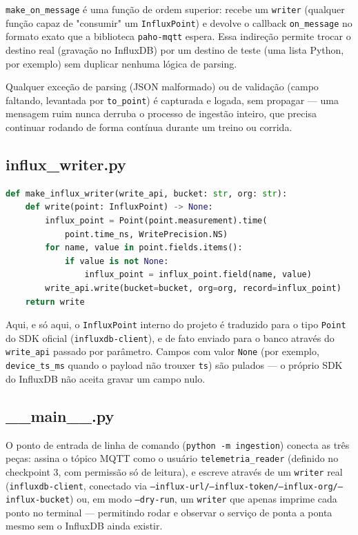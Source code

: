 \documentclass[11pt,a4paper]{article}
\begin{document}
\texttt{make\_on\_message} é uma função de ordem superior: recebe um \texttt{writer} (qualquer função capaz de "consumir" um \texttt{InfluxPoint}) e devolve o callback \texttt{on\_message} no formato exato que a biblioteca \texttt{paho-mqtt} espera. Essa indireção permite trocar o destino real (gravação no InfluxDB) por um destino de teste (uma lista Python, por exemplo) sem duplicar nenhuma lógica de parsing.

Qualquer exceção de parsing (JSON malformado) ou de validação (campo faltando, levantada por \texttt{to\_point}) é capturada e logada, sem propagar --- uma mensagem ruim nunca derruba o processo de ingestão inteiro, que precisa continuar rodando de forma contínua durante um treino ou corrida.

\subsection{influx\_writer.py}

\begin{lstlisting}[language=Python,caption={ingestion/influx\_writer.py}]
def make_influx_writer(write_api, bucket: str, org: str):
    def write(point: InfluxPoint) -> None:
        influx_point = Point(point.measurement).time(
            point.time_ns, WritePrecision.NS)
        for name, value in point.fields.items():
            if value is not None:
                influx_point = influx_point.field(name, value)
        write_api.write(bucket=bucket, org=org, record=influx_point)
    return write
\end{lstlisting}

Aqui, e só aqui, o \texttt{InfluxPoint} interno do projeto é traduzido para o tipo \texttt{Point} do SDK oficial (\texttt{influxdb-client}), e de fato enviado para o banco através do \texttt{write\_api} passado por parâmetro. Campos com valor \texttt{None} (por exemplo, \texttt{device\_ts\_ms} quando o payload não trouxer \texttt{ts}) são pulados --- o próprio SDK do InfluxDB não aceita gravar um campo nulo.

\subsection{\_\_main\_\_.py}

O ponto de entrada de linha de comando (\texttt{python -m ingestion}) conecta as três peças: assina o tópico MQTT como o usuário \texttt{telemetria\_reader} (definido no checkpoint 3, com permissão só de leitura), e escreve através de um \texttt{writer} real (\texttt{influxdb-client}, conectado via \texttt{--influx-url/--influx-token/--influx-org/--influx-bucket}) ou, em modo \texttt{--dry-run}, um \texttt{writer} que apenas imprime cada ponto no terminal --- permitindo rodar e observar o serviço de ponta a ponta mesmo sem o InfluxDB ainda existir.
\end{document}
